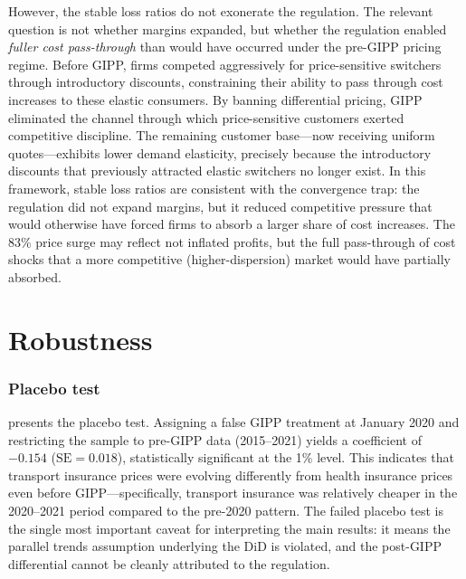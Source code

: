 \documentclass[12pt]{article}
\begin{document}
However, the stable loss ratios do not exonerate the regulation. The relevant question is not whether margins expanded, but whether the regulation enabled \textit{fuller cost pass-through} than would have occurred under the pre-GIPP pricing regime. Before GIPP, firms competed aggressively for price-sensitive switchers through introductory discounts, constraining their ability to pass through cost increases to these elastic consumers. By banning differential pricing, GIPP eliminated the channel through which price-sensitive customers exerted competitive discipline. The remaining customer base---now receiving uniform quotes---exhibits lower demand elasticity, precisely because the introductory discounts that previously attracted elastic switchers no longer exist. In this framework, stable loss ratios are consistent with the convergence trap: the regulation did not expand margins, but it reduced competitive pressure that would otherwise have forced firms to absorb a larger share of cost increases. The 83\% price surge may reflect not inflated profits, but the full pass-through of cost shocks that a more competitive (higher-dispersion) market would have partially absorbed.




\section{Robustness}

\subsubsection*{Placebo test}  presents the placebo test. Assigning a false GIPP treatment at January 2020 and restricting the sample to pre-GIPP data (2015--2021) yields a coefficient of $-0.154$ ($\text{SE} = 0.018$), statistically significant at the 1\% level. This indicates that transport insurance prices were evolving differently from health insurance prices even before GIPP---specifically, transport insurance was relatively cheaper in the 2020--2021 period compared to the pre-2020 pattern. The failed placebo test is the single most important caveat for interpreting the main results: it means the parallel trends assumption underlying the DiD is violated, and the post-GIPP differential cannot be cleanly attributed to the regulation.


\end{document}
